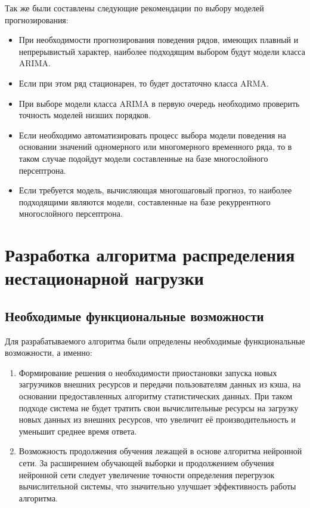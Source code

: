 \documentclass[a4paper,14pt,russian]{extreport}
\begin{document}
Так же были составлены следующие рекомендации по выбору моделей 
прогнозирования:
\begin{itemize}
	\item При необходимости прогнозирования поведения рядов, имеющих 
		плавный и непрерывистый характер, наиболее подходящим выбором 
		будут модели класса ARIMA. 
	\item Если при этом ряд стационарен, то будет достаточно класса ARMA.
	\item При выборе модели класса ARIMA в первую очередь необходимо 
		проверить точность моделей низших порядков.
	\item Если необходимо автоматизировать процесс выбора модели поведения 
		на основании значений одномерного или многомерного временного 
		ряда, то в таком случае подойдут модели составленные на базе 
		многослойного персептрона.
	\item Если требуется модель, вычисляющая многошаговый прогноз, то 
		наиболее подходящими являются модели, составленные на базе 
		рекуррентного многослойного персептрона.
\end{itemize}

\chapter{Разработка алгоритма распределения нестационарной нагрузки}
\section{Необходимые функциональные возможности}
Для разрабатываемого алгоритма были определены необходимые 
функциональные возможности, а именно: 
\begin{enumerate}
	\item Формирование решения о необходимости приостановки запуска 
		новых загрузчиков внешних ресурсов и передачи пользователям 
		данных из кэша, на основании предоставленных алгоритму 
		статистических данных. При таком подходе система не будет тратить 
		свои вычислительные ресурсы на загрузку новых данных из внешних 
		ресурсов, что увеличит её производительность и уменьшит среднее 
		время ответа. 
	\item Возможность продолжения обучения лежащей в основе алгоритма 
		нейронной сети. За расширением обучающей выборки и продолжением 
		обучения нейронной сети следует увеличение точности определения 
		перегрузок вычислительной системы, что значительно улучшает 
		эффективность работы алгоритма.
\end{enumerate}
\end{document}

